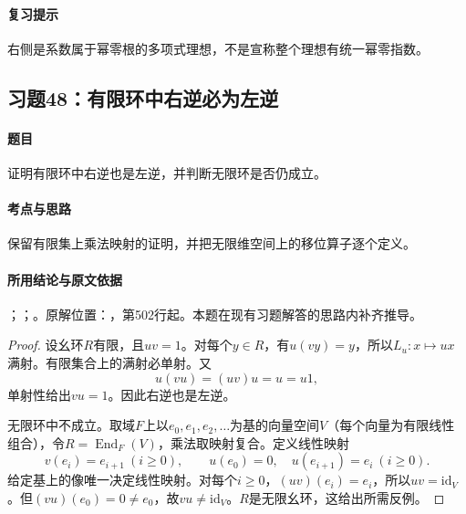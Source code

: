 \paragraph{复习提示}

右侧是系数属于幂零根的多项式理想，不是宣称整个理想有统一幂零指数。



\subsection{习题48：有限环中右逆必为左逆}

\label{ex:3:48}

\paragraph{题目}

证明有限环中右逆也是左逆，并判断无限环是否仍成立。

\paragraph{考点与思路}

保留有限集上乘法映射的证明，并把无限维空间上的移位算子逐个定义。

\paragraph{所用结论与原文依据}

；；。原解位置：，第502行起。本题在现有习题解答的思路内补齐推导。


\begin{proof}

设幺环$R$有限，且$uv=1$。对每个$y\in R$，有$u(vy)=y$，所以$L_u:x\mapsto ux$满射。有限集合上的满射必单射。又
\[
u(vu)=(uv)u=u=u1,
\]
单射性给出$vu=1$。因此右逆也是左逆。

无限环中不成立。取域$F$上以$e_0,e_1,e_2,\ldots$为基的向量空间$V$（每个向量为有限线性组合），令$R=\operatorname{End}_F(V)$，乘法取映射复合。定义线性映射
\[
v(e_i)=e_{i+1}\ (i\ge0),\qquad u(e_0)=0,\quad u(e_{i+1})=e_i\ (i\ge0).
\]
给定基上的像唯一决定线性映射。对每个$i\ge0$，$(uv)(e_i)=e_i$，所以$uv=\mathrm{id}_V$。但$(vu)(e_0)=0\ne e_0$，故$vu\ne\mathrm{id}_V$。$R$是无限幺环，这给出所需反例。

\end{proof}

